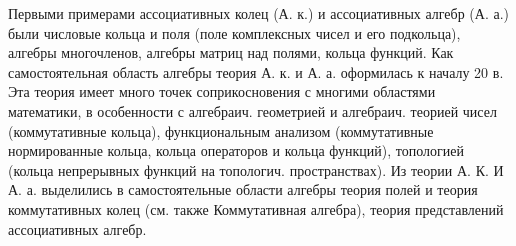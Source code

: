 \documentclass[10pt]{article}
\begin{document}
Первыми примерами ассоциативных колец (А. к.) и ассоциативных алгебр (А. а.) были числовые кольца и поля (поле комплексных чисел и его подкольца), алгебры многочленов, алгебры матриц над полями, кольца функций. Как самостоятельная область алгебры теория А. к. и А. а. оформилась к началу 20 в. Эта теория имеет много точек соприкосновения с многими областями математики, в особенности с алгебраич. геометрией и алгебраич. теорией чисел (коммутативные кольца), функциональным анализом (коммутативные нормированные кольца, кольца операторов и кольца функций), топологией (кольца непрерывных функций на топологич. пространствах). Из теории А. К. И А. а. выделились в самостоятельные области алгебры теория полей и теория коммутативных колец (см. также Коммутативная алгебра), теория представлений ассоциативных алгебр.
\end{document}
